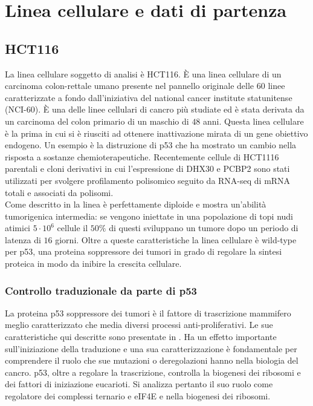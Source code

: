 \chapter{Linea cellulare e dati di partenza}
\label{cha:cell_lines}

\section{HCT116}
\label{sec:hct116}
La linea cellulare soggetto di analisi \`e HCT116.
\`E una linea cellulare di un carcinoma colon-rettale umano presente nel pannello originale delle $60$ linee caratterizzate a fondo dall'iniziativa del national cancer institute statunitense (NCI-$60$).
\`E una delle linee cellulari di cancro pi\`u studiate ed \`e stata derivata da un carcinoma del colon primario di un maschio di $48$ anni.
Questa linea cellulare \`e la prima in cui si \`e riusciti ad ottenere inattivazione mirata di un gene obiettivo endogeno.
Un esempio \`e la distruzione di p53 che ha mostrato un cambio nella risposta a sostanze chemioterapeutiche.\cite{p53disruption}
Recentemente cellule di HCT1116 parentali e cloni derivativi in cui l'espressione di DHX30 e PCBP2 sono stati utilizzati per svolgere profilamento polisomico seguito da RNA-seq di mRNA totali e associati da polisomi.\\
Come descritto in \cite{hct116} la linea \`e perfettamente diploide e mostra un'abilit\`a tumorigenica intermedia: se vengono iniettate in una popolazione di topi nudi atimici $5\cdot 10^6$ cellule il $50\%$ di questi sviluppano un tumore dopo un periodo di latenza di $16$ giorni.
Oltre a queste caratteristiche la linea cellulare \`e wild-type per p53, una proteina soppressore dei tumori in grado di regolare la sintesi proteica in modo da inibire la crescita cellulare.

  \subsection{Controllo traduzionale da parte di p53}
  \label{subsec:p53}
  La proteina p53 soppressore dei tumori \`e il fattore di trascrizione mammifero meglio caratterizzato che media diversi processi anti-proliferativi.
  Le sue caratteristiche qui descritte sono presentate in \cite{transconp53}.
  Ha un effetto importante sull'iniziazione della traduzione e una sua caratterizzazione \`e fondamentale per comprendere il ruolo che sue mutazioni o deregolazioni hanno nella biologia del cancro.
  p53, oltre a regolare la trascrizione, controlla la biogenesi dei ribosomi e dei fattori di iniziazione eucarioti.
  Si analizza pertanto il suo ruolo come regolatore dei complessi ternario e eIF4E e nella biogenesi dei ribosomi.

